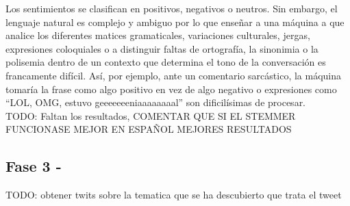 \documentclass[../all.tex]{subfiles}
\begin{document}
    Los sentimientos se clasifican en positivos, negativos o neutros. Sin embargo, el lenguaje natural es complejo y ambiguo por lo que enseñar a una máquina a que analice los diferentes matices gramaticales, variaciones culturales, jergas, expresiones coloquiales o a distinguir faltas de ortografía, la sinonimia o la polisemia dentro de un contexto que determina el tono de la conversación es francamente difícil. Así, por ejemplo, ante un comentario sarcástico, la máquina tomaría la frase como algo positivo en vez de algo negativo o expresiones como “LOL, OMG, estuvo geeeeeeeniaaaaaaaal” son dificilísimas de procesar.\\
    
	{\color{red} 
		TODO: Faltan los resultados, COMENTAR QUE SI EL STEMMER FUNCIONASE MEJOR EN ESPAÑOL MEJORES RESULTADOS
	}
\newpage
\subsection{Fase 3 -}
	{\color{red} 
		TODO: obtener twits sobre la tematica que se ha descubierto que trata el tweet
	}

\end{document}
